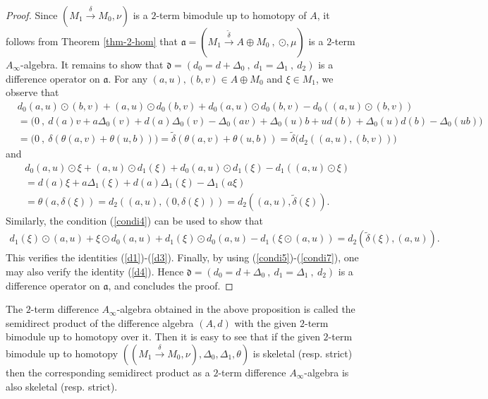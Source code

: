 \documentclass[a4paper,reqno,10pt]{amsart}
\theoremstyle{plain}
\theoremstyle{definition}
\theoremstyle{remark}
\begin{document}
\begin{proof}
    Since $ ( M_1 \xrightarrow{\delta  }  M_0 , \nu )$ is a $2$-term bimodule up to homotopy of $A$, it follows from Theorem \ref{thm-2-hom} that $\mathfrak{a} =  ( M_1 \xrightarrow{\widetilde{\delta } } A \oplus M_0 ~ \! , ~ \! \odot, \mu )$ is a $2$-term $A_\infty$-algebra. It remains to show that $\mathfrak{d} = (d_0 = d + \Delta_0 ~ \!, ~ \! d_1 = \Delta_1 ~ \!, ~ \! d_2)$ is a difference operator on $\mathfrak{a}$. For any $(a, u), (b, v) \in A \oplus M_0$ and $\xi \in M_1$, we observe that
    \begin{align*}
        &d_0 (a, u) \odot (b, v) + (a, u) \odot d_0 (b, v) + d_0 (a, u) \odot d_0 (b, v) - d_0 ((a, u) \odot (b, v) ) \\
        &= \big( 0 ~ \! , ~ \! d(a) v + a \Delta_0 (v) + d(a) \Delta_0 (v) - \Delta_0 (a v) + \Delta_0 (u) b + u d(b) + \Delta_0 (u) d(b) - \Delta_0 (ub) \big) \\
        &= \big(  0 ~ \!, ~ \! \delta ( \theta (a, v) + \theta ( u, b) )  \big) = \widetilde{\delta} ( \theta (a, v) + \theta (u, b) ) = \widetilde{\delta} \big(  d_2 ((a, u), (b, v) )  \big)
    \end{align*}
    and
    \begin{align*}
        &d_0 (a, u) \odot \xi + (a, u) \odot d_1 (\xi) + d_0 (a, u) \odot d_1 (\xi) - d_1 ((a, u) \odot \xi ) \\
        &= d(a) \xi + a \Delta_1 (\xi) + d(a) \Delta_1 (\xi) - \Delta_1 (a \xi) \\
        &= \theta (a , \delta (\xi)) = d_2 ((a, u), (0, \delta (\xi)) ) = d_2 ((a, u), \widetilde{\delta} (\xi) ).
    \end{align*}
    Similarly, the condition (\ref{condi4}) can be used to show that
    \begin{align*}
        d_1 (\xi) \odot (a, u) + \xi \odot d_0 (a, u) + d_1 (\xi) \odot d_0 (a, u) - d_1 (\xi \odot (a, u) ) = d_2 ( \widetilde{\delta} (\xi), (a, u)).
    \end{align*}
    This verifies the identities (\ref{d1})-(\ref{d3}). Finally, by using (\ref{condi5})-(\ref{condi7}), one may also verify the identity (\ref{d4}). Hence $\mathfrak{d} = (d_0 = d + \Delta_0 ~ \! , ~ \! d_1= \Delta_1 ~ \!, ~ \! d_2)$ is a difference operator on $\mathfrak{a}$, and concludes the proof.
\end{proof}


The $2$-term difference $A_\infty$-algebra obtained in the above proposition is called the semidirect product of the difference algebra $(A, d)$ with the given $2$-term bimodule up to homotopy over it. Then it is easy to see that if the given $2$-term bimodule up to homotopy $((M_1 \xrightarrow{\delta} M_0, \nu), \Delta_0, \Delta_1, \theta)$ is skeletal (resp. strict) then the corresponding semidirect product as a $2$-term difference $A_\infty$-algebra is also skeletal (resp. strict).
\end{document}

